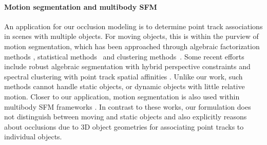 

\vspace{-0.3cm}
\paragraph{Motion segmentation and multibody SFM}
An application for our occlusion modeling is to determine point track associations in scenes with multiple objects. For moving objects, this is within the purview of motion segmentation, which has been approached through algebraic factorization methods \cite{Costeria98,Vidal03,Vidal04}, statistical methods~\cite{Kanatani01,Gruber04,Rao08} and clustering methods~\cite{Yan06,Goh07}. Some recent efforts include robust algebraic segmentation with hybrid perspective constraints \cite{Rao_etal_2010} and spectral clustering with point track spatial affinities \cite{Brox_Malik_2010}. Unlike our work, such methods cannot handle static objects, or dynamic objects with little relative motion.
Closer to our application, motion segmentation is also used within multibody SFM frameworks \cite{Ozden_etal_2010,Kundu_etal_2011,Namdev2012}. In contrast to these works, our formulation does not distinguish between moving and static objects and also explicitly reasons about occlusions due to 3D object geometries for associating point tracks to individual objects.


